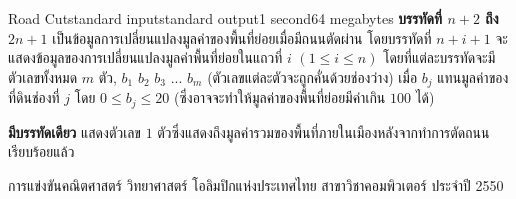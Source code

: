 \documentclass[11pt,a4paper]{article}
\begin{document}
\begin{problem}{Road Cut}{standard input}{standard output}{1 second}{64 megabytes}
\textbf{บรรทัดที่ $n+2$ ถึง $2n+1$} เป็นข้อมูลการเปลี่ยนแปลงมูลค่าของพื้นที่ย่อยเมื่อมีถนนตัดผ่าน โดยบรรทัดที่ $n+i+1$ จะแสดงข้อมูลของการเปลี่ยนแปลงมูลค่าพื้นที่ย่อยในแถวที่ $i$ $(1 \leq i \leq n)$ โดยที่แต่ละบรรทัดจะมีตัวเลขทั้งหมด $m$ ตัว, $b_1$ $b_2$ $b_3$ $...$ $b_m$ (ตัวเลขแต่ละตัวจะถูกคั่นด้วยช่องว่าง) เมื่อ $b_j$ แทนมูลค่าของที่ดินช่องที่ $j$ โดย $0 \leq b_j \leq 20$ (ซึ่งอาจจะทำให้มูลค่าของพื้นที่ย่อยมีค่าเกิน $100$ ได้)

\OutputFile

\textbf{มีบรรทัดเดียว} แสดงตัวเลข $1$ ตัวซึ่งแสดงถึงมูลค่ารวมของพื้นที่ภายในเมืองหลังจากทำการตัดถนนเรียบร้อยแล้ว

\Examples

\begin{example}
%
\end{example}


\Source

การแข่งขันคณิตศาสตร์ วิทยาศาสตร์ โอลิมปิกแห่งประเทศไทย สาขาวิชาคอมพิวเตอร์ ประจำปี 2550

\end{problem}
\end{document}

